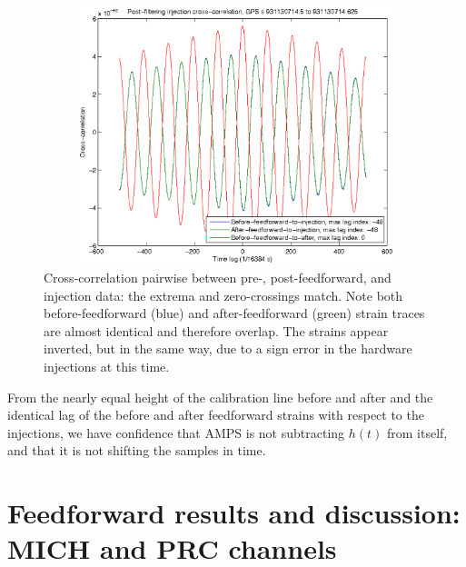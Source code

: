 \begin{figure}
\begin{center}
\includegraphics[height=75mm, width=150mm]{figure8.eps}
\caption{Cross-correlation pairwise between pre-, post-feedforward, and injection data: the extrema and zero-crossings match.  Note both before-feedforward (blue) and after-feedforward (green) strain traces are almost identical and therefore overlap. The strains appear inverted, but in the same way, due to a sign error in the hardware injections at this time.}
\label{crossCorrelationGraph}
\end{center}
\end{figure}

        From the nearly equal height of the calibration line before and after and the identical lag of the before and after feedforward strains with respect to the injections, we have confidence that AMPS is not subtracting $h(t)$ from itself, and that it is not shifting the samples in time.

    \section{Feedforward results and discussion: MICH and PRC channels}
    \label{out-of-loop}

